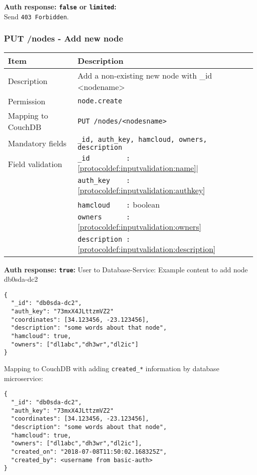\textbf{Auth response: \texttt{false} or \texttt{limited}:}\\
Send \verb|403 Forbidden|.

\newpage
\subsubsection{PUT /nodes - Add new node}
\label{protocoldef:microservicesapi:database:putnodes/node_create}
\begin{table}[htbp]
  \begin{tabular}{|l|p{12cm}|} \hline
    Item               & Description  \\ \hline \hline
    Description        & Add a non-existing new node with \_id <nodename>\\ \hline
    Permission         & \verb|node.create| \\ \hline
    Mapping to CouchDB & \verb|PUT /nodes/<nodesname>|\\ \hline
    Mandatory fields   & \verb|_id, auth_key, hamcloud, owners, description| \\ \hline
    Field validation   & \verb|_id         :| \ref{protocoldef:inputvalidation:name}| \\
                       & \verb|auth_key    :| \ref{protocoldef:inputvalidation:authkey} \\
                       & \verb|hamcloud    :| boolean \\
                       & \verb|owners      :| \ref{protocoldef:inputvalidation:owners} \\
                       & \verb|description :| \ref{protocoldef:inputvalidation:description}\\ \hline
  \end{tabular}
\end{table}

\textbf{Auth response: \texttt{true}:}
User to Database-Service: Example content to add node db0sda-dc2
\begin{lstlisting}
{
  "_id": "db0sda-dc2",
  "auth_key": "73mxX4JLttzmVZ2"
  "coordinates": [34.123456, -23.123456],
  "description": "some words about that node",
  "hamcloud": true,
  "owners": ["dl1abc","dh3wr","dl2ic"]
}
\end{lstlisting}

Mapping to CouchDB with adding \verb|created_*| information by database microservice:\\
\begin{lstlisting}
{
  "_id": "db0sda-dc2",
  "auth_key": "73mxX4JLttzmVZ2"
  "coordinates": [34.123456, -23.123456],
  "description": "some words about that node",
  "hamcloud": true,
  "owners": ["dl1abc","dh3wr","dl2ic"],
  "created_on": "2018-07-08T11:50:02.168325Z",
  "created_by": <username from basic-auth>
}
\end{lstlisting}


